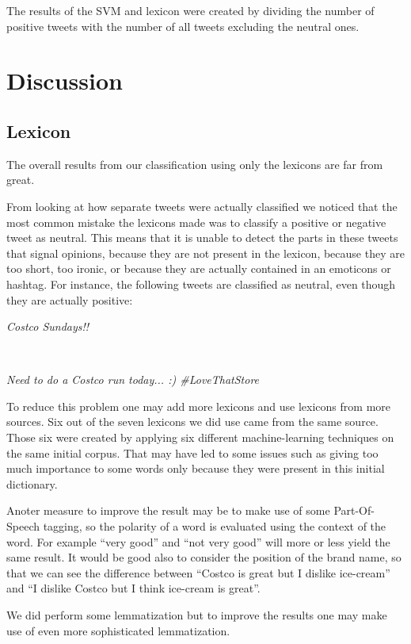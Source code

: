 \documentclass[a4paper,12pt]{report}
\begin{document}
The results of the SVM and lexicon were created by dividing the number of positive tweets with the number of all tweets excluding the neutral ones.

\chapter{Discussion}

\section{Lexicon}

The overall results from our classification using only the lexicons are far from great. 

From looking at how separate tweets were actually classified we noticed that the most common mistake the lexicons made was to classify a positive or negative tweet as neutral. 
This means that it is unable to detect the parts in these tweets that signal opinions, because they are not present in the lexicon, because they are too short, too ironic, or because they are actually contained in an emoticons or hashtag.
For instance, the following tweets are classified as neutral, even though they are actually positive:\\
\centerline{\textit{Costco Sundays!!}}\\
\centerline{\textit{Need to do a Costco run today... :) \#LoveThatStore}}

To reduce this problem one may add more lexicons and use lexicons from more sources. Six out of the seven lexicons we did use came from the same source. Those six were created by applying six different machine-learning techniques on the same initial corpus. That may have led to some issues such as giving too much importance to some words only because they were present in this initial dictionary.

Anoter measure to improve the result may be to make use of some Part-Of-Speech tagging, so the polarity of a word is evaluated using the context of the word. For example ``very good'' and ``not very good'' will more or less yield the same result. It would be good also to consider the position of the brand name, so that we can see the difference between ``Costco is great but I dislike ice-cream'' and ``I dislike Costco but I think ice-cream is great''.

We did perform some lemmatization but to improve the results one may make use of even more sophisticated lemmatization.
\end{document}
